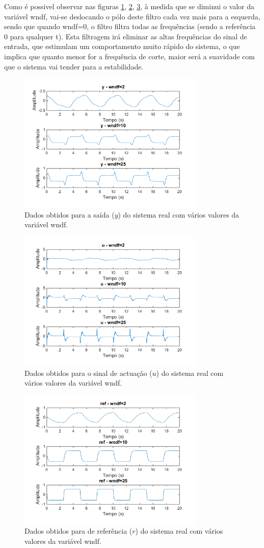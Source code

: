 \documentclass[%
  reprint,
  nofootinbib,
  amsmath,amssymb,
  aps,
  10pt,
  a4paper
]{revtex4-1}
\begin{document}
Como é possivel observar nas figuras \ref{fig:pf_y}, \ref{fig:pf_u}, \ref{fig:pf_ref}, à medida que se diminui o valor da variável wndf, vai-se deslocando o pólo deste filtro cada vez mais para a esquerda, sendo que quando wndf=0, o filtro filtra todas as frequências (sendo a referência 0 para qualquer t). Esta filtragem irá eliminar as altas frequências do sinal de entrada, que estimulam um comportamento muito rápido do sistema, o que implica que quanto menor for a frequência de corte, maior será a suavidade com que o sistema vai tender para a estabilidade.
\begin{figure}[t]
\includegraphics[width=3.5in]{../img/y_filtro.png}
\caption{Dados obtidos para a saída ($y$) do sistema real com vários valores da variável wndf.}
\label{fig:pf_y}
\end{figure}
\begin{figure}[t]
\includegraphics[width=3.5in]{../img/u_filtro.png}
\caption{Dados obtidos para o sinal de actuação ($u$) do sistema real com vários valores da variável wndf.}
\label{fig:pf_u}
\end{figure}
\begin{figure}[t]
\includegraphics[width=3.5in]{../img/ref_filtro.png}
\caption{Dados obtidos para de referência ($r$) do sistema real com vários valores da variável wndf.}
\label{fig:pf_ref}
\end{figure}
\end{document}
